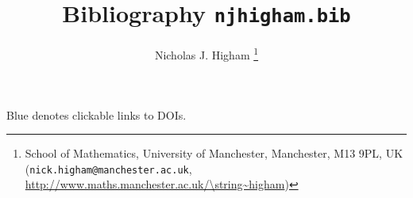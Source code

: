 \documentclass[12pt]{article}
\title{Bibliography \texttt{njhigham.bib}}
\author{Nicholas J. Higham%
        \thanks{%
                School of Mathematics,
                University of Manchester,
                Manchester, M13 9PL, UK 
                (\texttt{nick.higham@manchester.ac.uk},
                \url{http://www.maths.manchester.ac.uk/\string~higham})
               }
}
\begin{document}
\maketitle
Blue denotes clickable links to DOIs.


\nocite{*}

% 

% 

\end{document}
